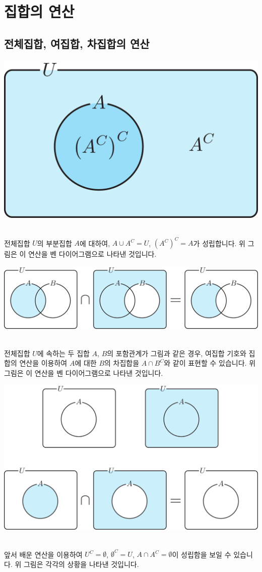 \clearpage
\section{집합의 연산}
\subsection{전체집합, 여집합, 차집합의 연산}
\begin{center} \includegraphics[scale=\pgfkeysvalueof{picsize}]{DBs/pic/zero_09.pdf}\
	\end{center}전체집합 $U$의 부분집합 $A$에 대하여, $A\cup A^C = U$, $\left( A^C \right)^C = A $가 성립합니다. 위 그림은 이 연산을 벤 다이어그램으로 나타낸 것입니다.
\begin{center} \includegraphics[scale=\pgfkeysvalueof{picsize}]{DBs/pic/zero_10.pdf}\
	\end{center}전체집합 $U$에 속하는 두 집합 $A$, $B$의 포함관계가 그림과 같은 경우, 여집합 기호와 집합의 연산을 이용하여 $A$에 대한 $B$의 차집합을 $A\cap B^C$와 같이 표현할 수 있습니다. 위 그림은 이 연산을 벤 다이어그램으로 나타낸 것입니다.
\begin{center} \includegraphics[scale=\pgfkeysvalueof{picsize}]{DBs/pic/zero_10_1.pdf}\
	\end{center}앞서 배운 연산을 이용하여 $U^C=\emptyset$, $\emptyset^C=U$,  $A \cap A^C = \emptyset$이 성립함을 보일 수 있습니다. 위 그림은 각각의 상황을 나타낸 것입니다.

